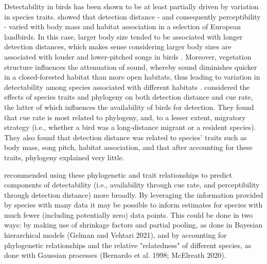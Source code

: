 \documentclass[12pt]{article}
\begin{document}
\par Detectability in birds has been shown to be at least partially driven by variation in species traits.
\cite{johnston_species_2014} showed that detection distance - and consequently perceptibility - varied with body mass and habitat association in a selection of European landbirds.
In this case, larger body size tended to be associated with longer detection distances, which makes sense considering larger body sizes are associated with louder and lower-pitched songs in birds \citep{bowman_adaptive_1979, fletcher_acoustics_1999, ryan_role_1985}.
Moreover, vegetation structure influences the attenuation of sound, whereby sound diminishes quicker in a closed-forested habitat than more open habitats, thus leading to variation in detectability among species associated with different habitats \citep{waide_tropical_1988, yip_sound_2017}.
\citet{solymos_phylogeny_2018} considered the effects of species traits and phylogeny on both detection distance and cue rate, the latter of which influences the availability of birds for detection.
They found that cue rate is most related to phylogeny, and, to a lesser extent, migratory strategy (i.e., whether a bird was a long-distance migrant or a resident species).
They also found that detection distance was related to species’ traits such as body mass, song pitch, habitat association, and that after accounting for these traits, phylogeny explained very little.

\par \citet{solymos_phylogeny_2018} recommended using these phylogenetic and trait relationships to predict components of detectability (i.e., availability through cue rate, and perceptibility through detection distance) more broadly.
By leveraging the information provided by species with many data it may be possible to inform estimates for species with much fewer (including potentially zero) data points.
This could be done in two ways: by making use of shrinkage factors and partial pooling, as done in Bayesian hierarchical models (Gelman and Vehtari 2021), and by accounting for phylogenetic relationships and the relative "relatedness" of different species, as done with Gaussian processes (Bernardo et al. 1998; McElreath 2020).
\end{document}
